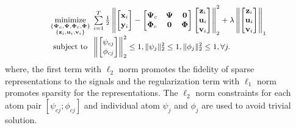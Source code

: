 \documentclass{article}
\begin{document}
\begin{equation} \label{Eq:CoupledDL_Clean}
\small
\begin{array}{cl}
\underset{ 
	\begin{subarray}{c}
	\left\{ \boldsymbol{\Psi}_{c}, \boldsymbol{\Psi}, \boldsymbol{\Phi}_{c}, \boldsymbol{\Phi} \right\}  \\
	\{ \mathbf{z}_i, \mathbf{u}_i, \mathbf{v}_i \}
	\end{subarray}}
{ \text{minimize}}
&  \! \! \! \!
\sum\limits_{i=1}^T
\frac{1}{2}
\left\|
\begin{bmatrix}
\mathbf{x}_i \\ \mathbf{y}_i 
\end{bmatrix}
-
\begin{bmatrix}
\boldsymbol{\Psi}_{c} & \boldsymbol{\Psi} & \mathbf{0} \\
\boldsymbol{\Phi}_{c} & \mathbf{0} & \boldsymbol{\Phi} \\
\end{bmatrix}
%
\begin{bmatrix}
\mathbf{z}_i \\
\mathbf{u}_i \\
\mathbf{v}_i \\
\end{bmatrix}
\right\|_2^2
+
\lambda
\left\| 
\begin{bmatrix}
\mathbf{z}_i \\
\mathbf{u}_i \\
\mathbf{v}_i \\
\end{bmatrix} 
\right\|_1
\\
\text{subject to}
& \! \! \! \!
\left\| \begin{bmatrix} \psi_{cj} \\ \phi_{cj} \end{bmatrix} \right\|_2^2 \leq 1, 
\| \psi_j \|_2^2 \leq 1, \| \phi_j \|_2^2 \leq 1, \forall j.
\end{array}
\end{equation}
\noindent
where, the first term with $\ell_2$ norm promotes the fidelity of sparse representations to the signals and the regularization term with $\ell_1$ norm promotes sparsity for the representations. The $\ell_2$ norm constraints for each atom pair $[\psi_{cj} ; \phi_{cj}]$ and individual atom $\psi_j$ and $\phi_j$ are used to avoid trivial solution.
\end{document}
